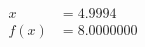 \documentclass[preview]{standalone}
\begin{document}
\begin{align*}
x &= 4.9994\\f(x) &= 8.0000000
\end{align*}
\end{document}
